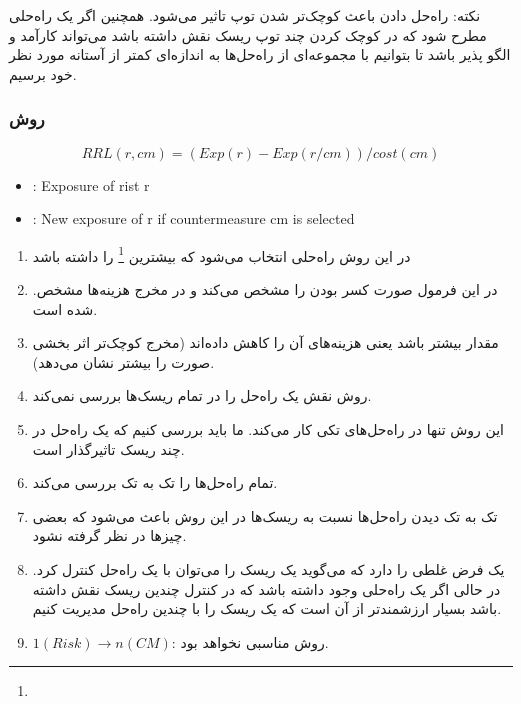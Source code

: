 نکته: راه‌حل دادن باعث کوچک‌تر شدن توپ تاثیر می‌شود. همچنین اگر یک راه‌حلی مطرح
شود که در کوچک کردن چند توپ ریسک نقش داشته باشد می‌تواند کارآمد و الگو پذیر باشد
تا بتوانیم با مجموعه‌ای از راه‌حل‌ها به اندازه‌ای کمتر از آستانه مورد نظر خود
برسیم.

\subsubsection{روش }

\begin{equation}
    RRL(r, cm) = (Exp(r) - Exp(r/cm))/cost(cm)
\end{equation}

\begin{LTR}
    \begin{itemize}
        \item {}: Exposure of rist r
        \item {}: New exposure of r if countermeasure cm is selected
    \end{itemize}
\end{LTR}

\begin{enumerate}
    \item در این روش راه‌حلی انتخاب می‌شود که بیشترین \footnote{} را داشته باشد
    \item .در این فرمول صورت کسر  بودن را مشخص می‌کند و در
    مخرج هزینه‌ها مشخص شده است.
    \item مقدار  بیشتر باشد یعنی هزینه‌های آن را کاهش داده‌اند (مخرج
    کوچک‌تر اثر بخشی صورت را بیشتر نشان می‌دهد).
    \item روش  نقش یک راه‌حل را در تمام ریسک‌ها بررسی نمی‌کند.
    \item این روش تنها در راه‌حل‌های تکی کار می‌کند. ما باید بررسی کنیم که یک
    راه‌حل در چند ریسک تاثیرگذار است.
    \item تمام راه‌حل‌ها را تک به تک بررسی می‌کند.
    \item تک به تک دیدن راه‌حل‌ها نسبت به ریسک‌ها در این روش باعث می‌شود که بعضی
    چیز‌ها در نظر گرفته نشود.
    \item یک فرض غلطی را دارد که می‌گوید یک ریسک را می‌توان با یک راه‌حل کنترل
    کرد. در حالی اگر یک راه‌حلی وجود داشته باشد که در کنترل چندین ریسک نقش داشته
    باشد بسیار ارزشمند‌تر از آن است که یک ریسک را با چندین راه‌حل مدیریت کنیم.
    \item $1(Risk) \rightarrow n(CM)$: روش مناسبی نخواهد بود.
\end{enumerate}


